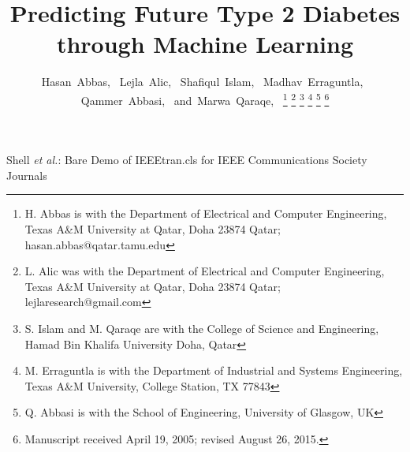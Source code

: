 \documentclass[journal,comsoc]{IEEEtran}
\begin{document}
%
\title{Predicting Future Type 2 Diabetes through Machine Learning}
%
%

\author{Hasan~Abbas,~
Lejla~Alic,~
Shafiqul~Islam,~
Madhav~Erraguntla,~
Qammer~Abbasi,~
and~Marwa~Qaraqe,~%
\thanks{H. Abbas is with the Department
of Electrical and Computer Engineering, Texas A\&M University at Qatar, Doha 23874 Qatar;  hasan.abbas@qatar.tamu.edu}%
\thanks{L. Alic was with the Department
of Electrical and Computer Engineering, Texas A\&M University at Qatar, Doha 23874 Qatar; lejlaresearch@gmail.com}%
\thanks{S. Islam and M. Qaraqe are with the College of Science and Engineering, Hamad Bin Khalifa University Doha, Qatar}%
\thanks{M. Erraguntla is with the Department of Industrial and Systems Engineering, Texas A\&M University, College Station, TX 77843}%
\thanks{Q. Abbasi is with the School of Engineering, University of Glasgow, UK}%
\thanks{Manuscript received April 19, 2005; revised August 26, 2015.}}

%
%



%
{Shell \MakeLowercase{\textit{et al.}}: Bare Demo of IEEEtran.cls for IEEE Communications Society Journals}
%
\end{document}
